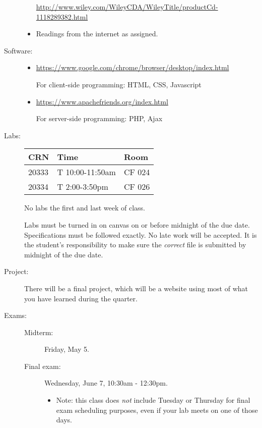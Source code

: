 \documentclass{article}
\begin{document}
\begin{description}
\begin{itemize}
    \url{http://www.wiley.com/WileyCDA/WileyTitle/productCd-1118289382.html}
  \item Readings from the internet as assigned.
  \end{itemize}
  

\item[Software:]\mbox{}
  
  \begin{itemize}
  \item \url{https://www.google.com/chrome/browser/desktop/index.html}

    For client-side programming: HTML, CSS, Javascript
  \item\url{https://www.apachefriends.org/index.html}

    For server-side programming: PHP, Ajax
  \end{itemize}

\item[Labs:]\mbox{}

  \begin{tabular}{|l|l|l|}\hline
    CRN & Time & Room \\\hline
    20333 & T 10:00-11:50am & CF 024 \\\hline
    20334 & T 2:00-3:50pm & CF 026\\\hline
  \end{tabular}
  
No labs the first and last week of class.

Labs must be turned in on canvas on or before midnight of
  the due date.  Specifications must be followed exactly.  No late
  work will be accepted.  It is the student's responsibility to make
  sure the {\em correct} file is submitted by midnight of the due
  date.

\item[Project:]  There will be a final project, which will be a
  website using most of what you have learned during the quarter.

\item[Exams:]\mbox{}
  
  \begin{description}
  \item[Midterm:]  Friday, May 5.
  \item[Final exam:] Wednesday, June 7, 10:30am - 12:30pm.
    \begin{itemize}
      \item Note:  this class does {\em not} include Tuesday or
        Thursday for final exam scheduling purposes,
        even if your lab meets on one of those days.
    \end{itemize}
  \end{description}
  

\end{description}
\end{document}
